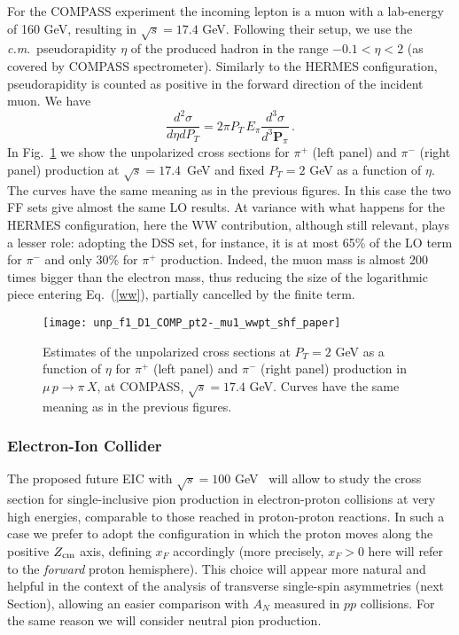 \documentclass[nofootinbib,superscriptaddress,aps]{revtex4}
\newcommand{\be}{\begin{equation}}
\newcommand{\ee}{\end{equation}}
\begin{document}
For the COMPASS experiment the incoming lepton is a muon with a lab-energy of 160 GeV, resulting in $\sqrt s = 17.4$ GeV. Following their setup, we use the \emph{c.m}.~pseudorapidity $\eta$ of the produced hadron in the range $-0.1<\eta < 2$ (as covered by COMPASS spectrometer). Similarly to the HERMES configuration, pseudorapidity is counted as positive in the forward direction of the incident muon. We have
\be
\frac{d^2\sigma}{d\eta dP_T} = 2\pi P_T\, E_\pi \frac{d^3\sigma}{d^3\bm{P}_\pi}\,.
\ee
In Fig.~\ref{fig:unp-comp-pt2} we show the unpolarized cross sections for $\pi^+$ (left panel) and $\pi^-$ (right panel) production at $\sqrt s = 17.4$~GeV and fixed $P_T=2$ GeV as a function of $\eta$. The curves have the same meaning as in the previous figures. In this case the two FF sets give almost the same LO results. At variance with what happens for the HERMES configuration, here the WW contribution, although still relevant, plays a lesser role: adopting the DSS set, for instance, it is at most 65\% of the LO term for $\pi^-$ and only 30\% for $\pi^+$ production. Indeed, the muon mass is almost 200 times bigger than the electron mass, thus reducing the size of the logarithmic piece entering Eq.~(\ref{ww}), partially cancelled by the finite term.


\begin{figure}[ht!]
 \centering
 \texttt{[image: unp\_f1\_D1\_COMP\_pt2-\_mu1\_wwpt\_shf\_paper]}
 \caption{Estimates of the unpolarized cross sections at $P_T=2$ GeV as a function of $\eta$ for $\pi^+$ (left panel) and $\pi^-$ (right panel) production in $\mu \, p \to \pi\,X$, at COMPASS, $\sqrt{s} = 17.4$ GeV. Curves have the same meaning as in the previous figures.
}
  \label{fig:unp-comp-pt2}
\end{figure}

\subsubsection{Electron-Ion Collider}

The proposed future EIC with $\sqrt s = 100$ GeV~\cite{Accardi:2012qut} will allow to study the cross section for single-inclusive pion production in electron-proton collisions at very high energies, comparable to those reached in  proton-proton reactions. In such a case we prefer to adopt the configuration in which the proton moves along the positive $Z_{\rm cm}$ axis, defining $x_F$ accordingly (more precisely, $x_F>0$ here will refer to the \emph{forward} proton hemisphere). This choice will appear more natural and helpful in the context of the analysis of transverse single-spin asymmetries (next Section), allowing an easier comparison with $A_N$ measured in $pp$ collisions. For the same reason we will consider neutral pion production.
\end{document}
